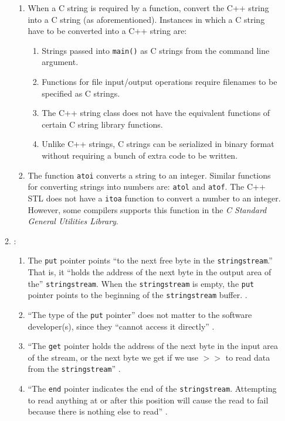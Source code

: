 \begin{enumerate}
\begin{enumerate}
\begin{enumerate}
		\item When a C string is required by a function, convert the C++ string into a C string (as aforementioned). Instances in which a C string have to be converted into a C++ string are: \vspace{-0.1cm}
			\begin{enumerate} \itemsep -1pt
			\item Strings passed into {\tt main()} as C strings from the command line argument.
			\item Functions for file input/output operations require filenames to be specified as C strings.
			\item The C++ string class does not have the equivalent functions of certain C string library functions.
			\item Unlike C++ strings, C strings can be serialized in binary format without requiring a bunch of extra code to be written.
			\end{enumerate}
		\item The function {\tt atoi} converts a string to an integer. Similar functions for converting strings into numbers are: {\tt atol} and {\tt atof}. The C++ STL does not have a {\tt itoa} function to convert a number to an integer. However, some compilers supports this function in the {\it C Standard General Utilities Library}.
		\end{enumerate}
	\item \cite{Heller2003}: \vspace{-0.2cm}
		\begin{enumerate} \itemsep -2pt
		\item The {\tt put} pointer points ``to the next free byte in the {\tt stringstream}.'' That is, it ``holds the address of the next byte in the output area of the'' {\tt stringstream}. When the {\tt stringstream} is empty, the {\tt put} pointer points to the beginning of the {\tt stringstream} buffer. \cite[\S9.8]{Heller2003}.
		\item ``The type of the {\tt put} pointer'' does not matter to the software developer(s), since they ``cannot access it directly'' \cite[\S9.8]{Heller2003}.
		\item ``The {\tt get} pointer holds the address of the next byte in the input area of the stream, or the next byte we get if we use $>>$ to read data from the {\tt stringstream}'' \cite[\S9.9]{Heller2003}.
		\item ``The {\tt end} pointer indicates the end of the {\tt stringstream}. Attempting to read anything at or after this position will cause the read to fail because there is nothing else to read'' \cite[\S9.9]{Heller2003}.

\end{enumerate}
\end{enumerate}
\end{enumerate}
